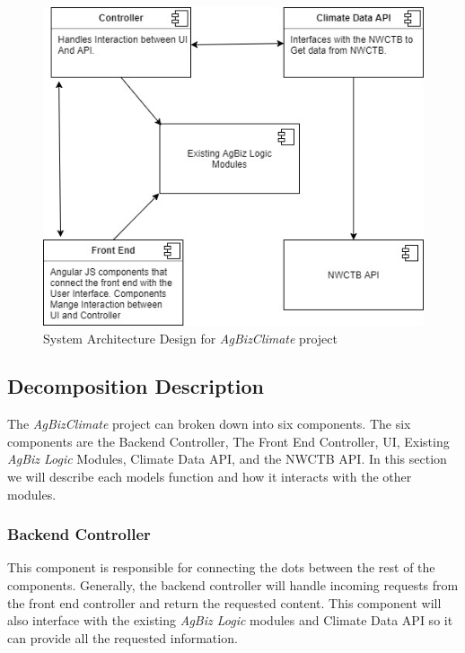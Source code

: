 \documentclass[onecolumn, draftclsnofoot,10pt, compsoc]{article}
\begin{document}
		\begin{figure}[htb]
			\begin{center}
				\includegraphics{UMLDiagrams/ArchitectureDesign.jpg}
			\end{center}
			\caption{System Architecture Design for \textit{AgBizClimate} project}
			\label{fig:Arch1}
		\end{figure}


	\subsection{Decomposition Description}
		The \textit{AgBizClimate} project can broken down into six components. The six components are the Backend Controller, The Front End Controller, UI, Existing \textit{AgBiz Logic} Modules, Climate Data API, and the NWCTB API. In this section we will describe each models function and how it interacts with the other modules.\\

		\subsubsection{Backend Controller}
			This component is responsible for connecting the dots between the rest of the components. Generally, the backend controller will handle incoming requests from the front end controller and return the requested content. This component will also interface with the existing \textit{AgBiz Logic} modules and Climate Data API so it can provide all the requested information.\\
\end{document}
